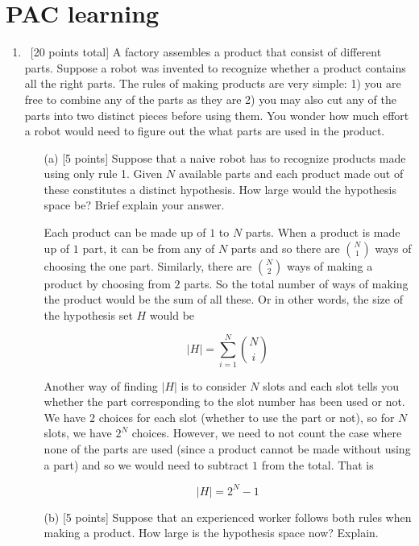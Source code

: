 \section{PAC learning}
\label{sec:pac-learning}
\begin{enumerate}

\item ~[20 points total] A factory assembles a product that consist of
  different parts. Suppose a robot was invented to recognize whether a
  product contains all the right parts. The rules of making products
  are very simple: 1) you are free to combine any of the parts as they
  are 2) you may also cut any of the parts into two distinct pieces
  before using them. You wonder how much effort a robot would need to
  figure out the what parts are used in the product.

\begin{itemize}
\item[(a)] [5 points] Suppose that a naive robot has to recognize
  products made using only rule 1. Given $N$ available parts and each
  product made out of these constitutes a distinct hypothesis. How
  large would the hypothesis space be? Brief explain your answer.
    
Each product can be made up of $1$ to $N$ parts. When a product is made up of $1$ part, it can be from any of $N$ parts and so there are ${N \choose 1}$ ways of choosing the one part. Similarly, there are ${N \choose 2}$ ways of making a product by choosing from $2$ parts. So the total number of ways of making the product would be the sum of all these. Or in other words, the size of the hypothesis set $H$ would be

$$
\left | H \right | = \sum_{i=1}^N {N \choose i}
$$

Another way of finding $\left|H\right|$ is to consider $N$ slots and each slot tells you whether the part corresponding to the slot number has been used or not. We have $2$ choices for each slot (whether to use the part or not), so for $N$ slots, we have $2^N$ choices. However, we need to not count the case where none of the parts are used (since a product cannot be made without using a part) and so we would need to subtract $1$ from the total. That is

$$
\left | H \right | = 2^N - 1
$$

\item[(b)] [5 points] Suppose that an experienced worker follows both
  rules when making a product. How large is the hypothesis space now?
  Explain.


\end{itemize}
\end{enumerate}
